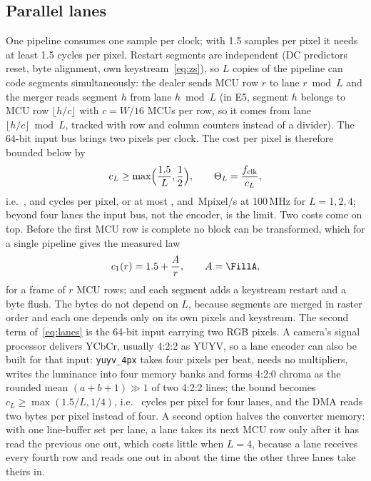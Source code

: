 \subsection{Parallel lanes}\label{sec:lanes}
One pipeline consumes one sample per clock; with 1.5 samples per pixel it needs at least 1.5 cycles per pixel. Restart segments are independent (DC predictors reset, byte alignment, own keystream~\eqref{eq:zs}), so $L$ copies of the pipeline can code segments simultaneously: the dealer sends MCU row $r$ to lane $r \bmod L$ and the merger reads segment $h$ from lane $h \bmod L$ (in E5, segment $h$ belongs to MCU row $\lfloor h/c \rfloor$ with $c = W/16$ MCUs per row, so it comes from lane $\lfloor h/c \rfloor \bmod L$, tracked with row and column counters instead of a divider). The 64-bit input bus brings two pixels per clock. The cost per pixel is therefore bounded below by
\begin{equation}
c_L \ge \max\Bigl(\frac{1.5}{L}, \frac{1}{2}\Bigr), \qquad \Theta_L = \frac{f_{\mathrm{clk}}}{c_L},
\label{eq:lanes}
\end{equation}
i.e.\ \BoundOneCpp, \BoundTwoCpp{} and \BoundFourCpp{} cycles per pixel, or at most \BoundOneMpix, \BoundTwoMpix{} and \BoundFourMpix\,Mpixel/s at 100\,MHz for $L = 1, 2, 4$; beyond four lanes the input bus, not the encoder, is the limit. Two costs come on top. Before the first MCU row is complete no block can be transformed, which for a single pipeline gives the measured law
\begin{equation}
c_1(r) = 1.5 + \frac{A}{r}, \qquad A = \FillA,
\label{eq:fill}
\end{equation}
for a frame of $r$ MCU rows; and each segment adds a keystream restart and a byte flush. The bytes do not depend on $L$, because segments are merged in raster order and each one depends only on its own pixels and keystream. The second term of~\eqref{eq:lanes} is the 64-bit input carrying two RGB pixels. A camera's signal processor delivers YCbCr, usually 4:2:2 as YUYV, so a lane encoder can also be built for that input: \texttt{yuyv\_4px} takes four pixels per beat, needs no multipliers, writes the luminance into four memory banks and forms 4:2:0 chroma as the rounded mean $(a+b+1)\gg 1$ of two 4:2:2 lines; the bound becomes $c_L \ge \max(1.5/L, 1/4)$, i.e.\ \BoundYuyvFourCpp{} cycles per pixel for four lanes, and the DMA reads two bytes per pixel instead of four. A second option halves the converter memory: with one line-buffer set per lane, a lane takes its next MCU row only after it has read the previous one out, which costs little when $L = 4$, because a lane receives every fourth row and reads one out in about the time the other three lanes take theirs in.

